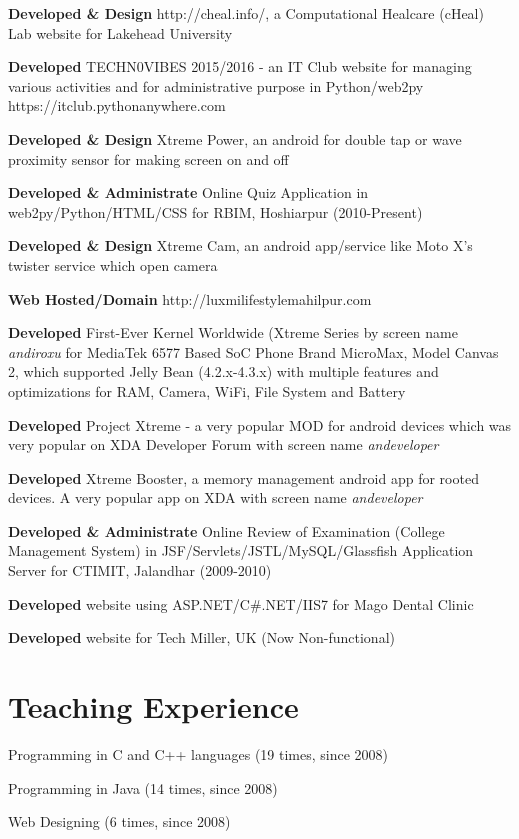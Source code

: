 \documentclass[margin,line]{res}
\begin{document}
\begin{resume}
\textbf{Developed \& Design} http://cheal.info/, a Computational Healcare (cHeal) Lab website for Lakehead University

\textbf{Developed} TECHN0VIBES 2015/2016 - an IT Club website for managing various activities and for administrative purpose in Python/web2py https://itclub.pythonanywhere.com

\textbf{Developed \& Design} Xtreme Power, an android for double tap or wave proximity sensor for making screen on and off

\textbf{Developed \& Administrate} Online Quiz Application in web2py/Python/HTML/CSS for RBIM, Hoshiarpur (2010-Present)

\textbf{Developed \& Design} Xtreme Cam, an android app/service like Moto X's twister service which open camera 

\textbf{Web Hosted/Domain} http://luxmilifestylemahilpur.com

\textbf{Developed} First-Ever Kernel Worldwide (Xtreme Series by screen name \textit{andiroxu} for MediaTek 6577 Based SoC Phone Brand MicroMax, Model Canvas 2, which supported Jelly Bean (4.2.x-4.3.x) with multiple features and optimizations for RAM, Camera, WiFi, File System and Battery 

\textbf{Developed} Project Xtreme - a very popular MOD for android devices which was very popular on XDA Developer Forum with screen name \textit{andeveloper}

\textbf{Developed} Xtreme Booster, a memory management android app for rooted devices. A very popular app on XDA with screen name \textit{andeveloper}

\textbf{Developed \& Administrate} Online Review of Examination (College Management System) in JSF/Servlets/JSTL/MySQL/Glassfish Application Server for CTIMIT, Jalandhar (2009-2010)

\textbf{Developed} website using ASP.NET/C\#.NET/IIS7 for Mago Dental Clinic

\textbf{Developed} website for Tech Miller, UK (Now Non-functional)

\section{\sc Teaching Experience}

Programming in C and C++ languages (19 times, since 2008)

Programming in Java (14 times, since 2008)

Web Designing (6 times, since 2008)


\end{resume}
\end{document}
